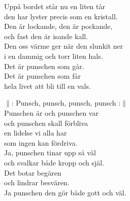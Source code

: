 \documentclass[a6paper, 10pt, twoside]{article}
\begin{document}
\noindent
\begin{center}
\end{center}
\begin{lyrics}
Uppå bordet står nu en liten tår\\
den har lyster precis som en kristall.\\
Den är lockande, den är pockande,\\
och fast den är isande kall.\\
Den oss värme ger när den slunkit ner\\
i en dammig och torr liten hals.\\
Det är punschen som går.\\
Det är punschen som får\\
hela livet att bli till en vals.
\end{lyrics}
\vspace{40pt}
\begin{center}
\end{center}
\begin{lyrics}
$\|$: Punsch, punsch, punsch, punsch :$\|$
\vspace{5pt}\\
Punschen är och punschen var\\
och punschen skall förbliva\\
en lidelse vi alla har\\
som ingen kan fördriva.
\vspace{5pt}\\
Ja, punschen tinar upp så väl\\
och svalkar både kropp och själ.\\
Det botar begären\\
och lindrar besvären.\\
Ja punschen den gör både gott och väl.
\end{lyrics}
\end{document}
